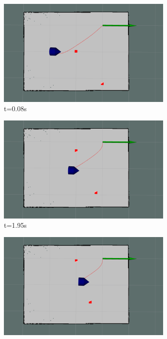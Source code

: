 \begin{figure}[ht]
    \centering
    \begin{subfigure}[b]{0.50\linewidth}
        \centering
        \includegraphics[width=0.95\textwidth]{images/spline_single_2_obs/4/12508.png}
        \caption{t=0.08s}
    \end{subfigure}%
    \begin{subfigure}[b]{0.50\linewidth}
        \centering
        \includegraphics[width=0.95\textwidth]{images/spline_single_2_obs/4/12695.png}
        \caption{t=1.95s}
    \end{subfigure}
    \begin{subfigure}[b]{0.50\linewidth}
        \centering
        \includegraphics[width=0.95\textwidth]{images/spline_single_2_obs/4/12783.png}

\end{subfigure}
\end{figure}
